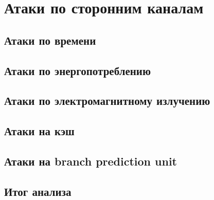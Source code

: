 \section{Атаки по сторонним каналам}
\clearpage

\subsection{Атаки по времени}
\clearpage

\subsection{Атаки по энергопотреблению}
\clearpage

\subsection{Атаки по электромагнитному излучению}
\clearpage

\subsection{Атаки на кэш}
\clearpage

\subsection{Атаки на branch prediction unit}
\clearpage

\subsection{Итог анализа}
\clearpage
